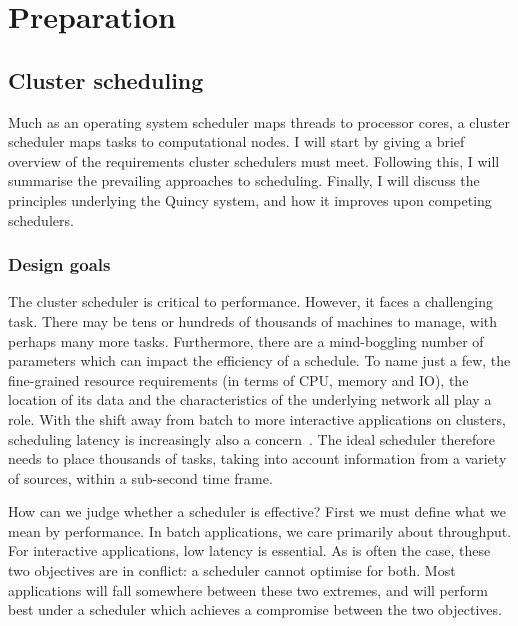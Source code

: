 \chapter{Preparation} \label{chap:prep}

\section{Cluster scheduling} \label{sec:prep-scheduling}

Much as an operating system scheduler maps threads to processor cores, a cluster scheduler maps tasks to computational nodes. I will start by giving a brief overview of the requirements cluster schedulers must meet. Following this, I will summarise the prevailing approaches to scheduling. Finally, I will discuss the principles underlying the Quincy system, and how it improves upon competing schedulers.

\subsection{Design goals} \label{sec:prep-scheduling-goals}

The cluster scheduler is critical to performance. However, it faces a challenging task. There may be tens or hundreds of thousands of machines to manage, with perhaps many more tasks. Furthermore, there are a mind-boggling number of parameters which can impact the efficiency of a schedule. To name just a few, the fine-grained resource requirements (in terms of CPU, memory and IO), the location of its data and the characteristics of the underlying network all play a role. With the shift away from batch to more interactive applications on clusters, scheduling latency is increasingly also a concern~\cite{Ousterhout:2013}. The ideal scheduler therefore needs to place thousands of tasks, taking into account information from a variety of sources, within a sub-second time frame.

How can we judge whether a scheduler is effective? First we must define what we mean by performance. In batch applications, we care primarily about throughput. For interactive applications, low latency is essential. As is often the case, these two objectives are in conflict: a scheduler cannot optimise for both. Most applications will fall somewhere between these two extremes, and will perform best under a scheduler which achieves a compromise between the two objectives.

